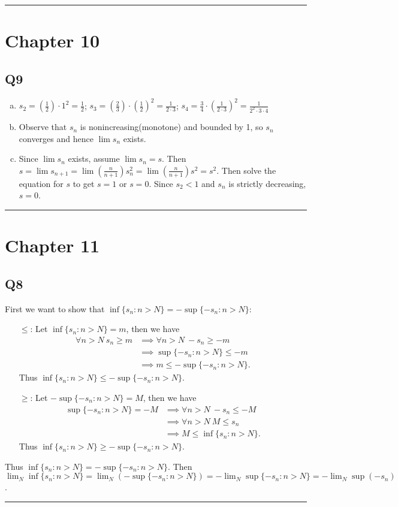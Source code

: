 \documentclass[12pt, lettersize]{article}
\newcommand{\lline}{\noindent\rule{\textwidth}{1pt}}
\begin{document}
	\lline
	\section*{Chapter 10}
	
	\subsection*{Q9}
	\begin{enumerate}[(a)]
		\item $s_2 = (\frac{1}{2})\cdot1^2=\frac{1}{2}$; $s_3=(\frac{2}{3})\cdot(\frac{1}{2})^2=\frac{1}{2\cdot3}$; $s_4=\frac{3}{4}\cdot(\frac{1}{2\cdot3})^2=\frac{1}{2^2\cdot3\cdot4}$
		\item Observe that $s_n$ is nonincreasing(monotone) and bounded by 1, so $s_n$ converges and hence $\lim s_n$ exists.
		\item Since $\lim s_n$ exists, assume $\lim s_n=s$. Then $s=\lim s_{n+1}=\lim(\frac{n}{n+1})s_n^2=\lim(\frac{n}{n+1})s^2=s^2$. Then solve the equation for $s$ to get $s=1$ or $s=0$. Since $s_2<1$ and $s_n$ is strictly decreasing, $s=0$.
	\end{enumerate}
	\lline
	
	\section*{Chapter 11}
	\subsection*{Q8}
	First we want to show that $\inf\{s_n: n>N\}=-\sup\{-s_n: n>N\}$:
	\begin{itemize}
		\item[$\leq$:] Let $\inf\{s_n: n>N\}=m$, then we have
		\begin{align*}
			\forall n>N\ s_n\geq m &\implies \forall n>N\ -s_n\geq -m\\
								   &\implies \sup\{-s_n: n>N\}\leq -m\\
								   &\implies m \leq -\sup\{-s_n: n>N\}.
		\end{align*}
		Thus $\inf\{s_n: n>N\}\leq-\sup\{-s_n: n>N\}$.
		\item[$\geq$:] Let $-\sup\{-s_n: n>N\}=M$, then we have
		\begin{align*}
			\sup\{-s_n: n>N\}=-M &\implies \forall n>N\ -s_n\leq -M\\
							   &\implies \forall n>N\ M\leq s_n\\
							   &\implies M\leq\inf\{s_n: n>N\}.
		\end{align*}
		Thus $\inf\{s_n: n>N\}\geq-\sup\{-s_n: n>N\}$.
	\end{itemize}
	Thus $\inf\{s_n: n>N\}=-\sup\{-s_n: n>N\}$. Then $\lim_N\inf\{s_n: n>N\}=\lim_N(-\sup\{-s_n: n>N\})=-\lim_N\sup\{-s_n: n>N\}=-\lim_N\sup(-s_n)$.
	
	\lline

	
\end{document}
